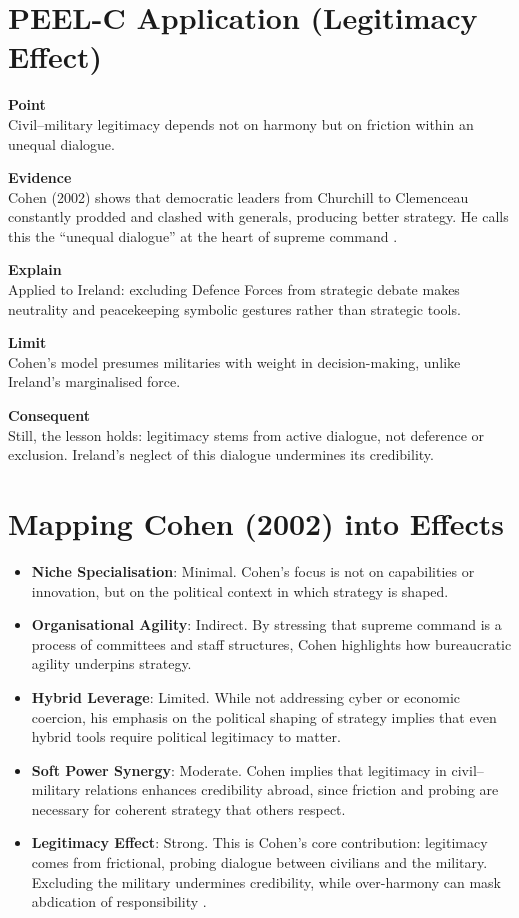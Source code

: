 \section*{PEEL-C Application (Legitimacy Effect)}

\textbf{Point} \\
Civil--military legitimacy depends not on harmony but on friction within an unequal dialogue.  

\textbf{Evidence} \\
Cohen (2002) shows that democratic leaders from Churchill to Clemenceau constantly prodded and clashed with generals, producing better strategy. He calls this the ``unequal dialogue'' at the heart of supreme command \parencite{COHEN_2002}.  

\textbf{Explain} \\
Applied to Ireland: excluding Defence Forces from strategic debate makes neutrality and peacekeeping symbolic gestures rather than strategic tools.  

\textbf{Limit} \\
Cohen’s model presumes militaries with weight in decision-making, unlike Ireland’s marginalised force.  

\textbf{Consequent} \\
Still, the lesson holds: legitimacy stems from active dialogue, not deference or exclusion. Ireland’s neglect of this dialogue undermines its credibility.  

\section*{Mapping Cohen (2002) into Effects}

\begin{itemize}
	\item \textbf{Niche Specialisation}: Minimal. Cohen’s focus is not on capabilities or innovation, but on the political context in which strategy is shaped.
	\item \textbf{Organisational Agility}: Indirect. By stressing that supreme command is a process of committees and staff structures, Cohen highlights how bureaucratic agility underpins strategy.
	\item \textbf{Hybrid Leverage}: Limited. While not addressing cyber or economic coercion, his emphasis on the political shaping of strategy implies that even hybrid tools require political legitimacy to matter.
	\item \textbf{Soft Power Synergy}: Moderate. Cohen implies that legitimacy in civil--military relations enhances credibility abroad, since friction and probing are necessary for coherent strategy that others respect.
	\item \textbf{Legitimacy Effect}: Strong. This is Cohen’s core contribution: legitimacy comes from frictional, probing dialogue between civilians and the military. Excluding the military undermines credibility, while over-harmony can mask abdication of responsibility \parencite{COHEN_2002}.
\end{itemize}

